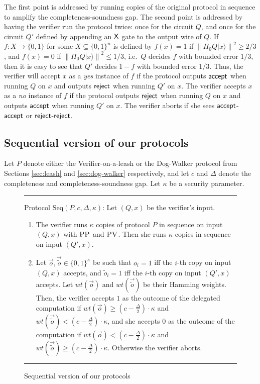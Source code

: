 \documentclass[11pt]{article}
\newcommand{\ket}[1]{|#1\rangle}
\newcommand{\norm}[1]{\left\|#1\right\|}
\newcommand{\pv}{\textsc{PV}}
\newcommand{\pp}{\textsc{PP}}
\begin{document}
The first point is addressed by running copies of the original protocol in sequence to amplify the completeness-soundness gap. The second point is addressed by having the verifier run the protocol twice: once for the circuit $Q$, and once for the circuit $Q'$ defined by appending an $\sf X$ gate to the output wire of $Q$. If $f:X\rightarrow \{0,1\}$ for some $X\subseteq \{0,1\}^n$ is defined by $f(x)=1$ if $\norm{\Pi_0 Q\ket{x}}^2\geq 2/3$, and $f(x)=0$ if $\norm{\Pi_0 Q\ket{x}}^2\leq 1/3$, i.e.\ $Q$ decides $f$ with bounded error $1/3$, then it is easy to see that $Q'$ decides $1-f$ with bounded error $1/3$. Thus, the verifier will accept $x$ as a \textit{yes} instance of $f$ if the protocol outputs ${\sf accept}$ when running $Q$ on $x$ and outputs $\sf reject$ when running $Q'$ on $x$. The verifier accepts $x$ as a \textit{no} instance of $f$ if the protocol outputs $\sf reject$ when running $Q$ on $x$ and outputs $\sf accept$ when running $Q'$ on $x$. The verifier aborts if she sees $\sf accept$-$\sf accept$ or $\sf reject$-$\sf reject$. 



\subsection{Sequential version of our protocols}


Let $P$ denote either the Verifier-on-a-leash or the Dog-Walker protocol from Sections \ref{sec:leash} and \ref{sec:dog-walker} respectively, and let $c$ and $\Delta$ denote the completeness and completeness-soundness gap. Let $\kappa$ be a security parameter.

\begin{figure}[H]
\rule[1ex]{16.5cm}{0.5pt}
\justify
Protocol $\mbox{Seq}(P,c,\Delta, \kappa)$: Let $(Q,x)$ be the verifier's input. 
\begin{enumerate}
\item The verifier runs $\kappa$ copies of protocol $P$ in sequence on input $(Q,x)$ with $\pp$ and $\pv$. Then she runs $\kappa$ copies in sequence on input $(Q',x)$. 
\item Let $\vec{o}, \vec{\tilde{o}} \in \{0,1\}^{\kappa}$ be such that $o_i = 1$ iff the $i$-th copy on input $(Q,x)$ accepts, and $\tilde{o}_i = 1$ iff the $i$-th copy on input $(Q',x)$ accepts. Let $wt(\vec{o})$ and $wt(\vec{\tilde{o}})$ be their Hamming weights. Then, the verifier accepts $1$ as the outcome of the delegated computation if $wt(\vec{o}) \geq (c- \frac{\Delta}{2}) \cdot \kappa$ and $wt(\vec{\tilde{o}}) < (c- \frac{\Delta}{2}) \cdot \kappa$, and she accepts $0$ as the outcome of the computation if $wt(\vec{o}) < (c- \frac{\Delta}{2})\cdot \kappa$ and $wt(\vec{\tilde{o}}) \geq (c- \frac{\Delta}{2}) \cdot \kappa$. Otherwise the verifier aborts.

\end{enumerate}
\rule[2ex]{16.5cm}{0.5pt}\vspace{-.5cm}
\caption{Sequential version of our protocols} \label{fig: gardenhose-protocol-parallel}
\end{figure}
\end{document}
